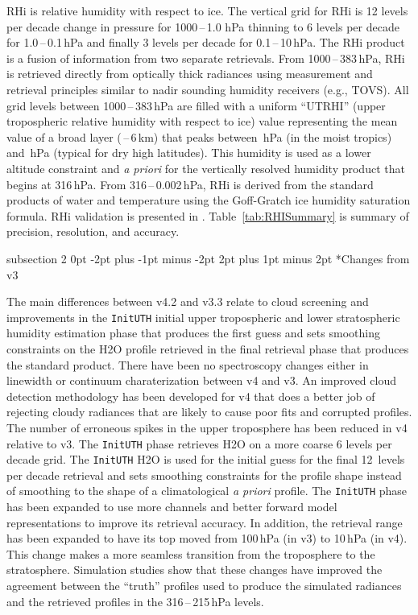 \documentclass[11pt,draft]{report}
\makeatletter
\renewcommand{\subsection}{\@startsection%
  {subsection}%
  {2}%
  {0pt}%
  {-2pt plus -1pt minus -2pt}%
  {2pt plus 1pt minus 2pt}%
  {\large\sffamily\fontseries{sb}\selectfont\flushleft\color{SectionColor}\figureversion{tabular}}}%
\makeatother
\begin{document}
RHi is relative humidity with respect to ice. The vertical grid for RHi
is 12 levels per decade change in pressure for 1000\,--\,1.0 hPa
thinning to 6 levels per decade for 1.0\,--\,0.1\,hPa and finally 3
levels per decade for 0.1\,--\,10\,hPa.  The RHi product is a
fusion of information from two separate retrievals.  From
1000\,--\,383\,hPa, RHi is retrieved directly from optically thick
radiances using measurement and retrieval principles similar to nadir
sounding humidity receivers (e.g., TOVS).  All grid levels between
1000\,--\,383\,hPa are filled with a uniform ``UTRHI'' (upper
tropospheric relative humidity with respect to ice) value representing
the mean value of a broad layer (\,--\,6\,km) that peaks
between \,hPa (in the moist tropics) and
\,hPa (typical for dry high latitudes).  This humidity
is used as a lower altitude constraint and \emph{a priori} for the
vertically resolved humidity product that begins at 316\,hPa. From
316\,--\,0.002\,hPa, RHi is derived from the standard products of water
and temperature using the Goff-Gratch ice humidity saturation
formula. RHi validation is presented in
\citet{ReadEtal07}. Table~\ref{tab:RHISummary} is summary of precision,
resolution, and accuracy.

\subsection*{Changes from v3}

The main differences between v4.2 and v3.3 relate to cloud screening and
improvements in the \texttt{InitUTH} initial upper tropospheric and
lower stratospheric humidity estimation phase that produces the first
guess and sets smoothing constraints on the H\cs2O profile retrieved in
the final retrieval phase that produces the standard product. There have
been no spectroscopy changes either in linewidth or continuum
charaterization between v4 and v3. An improved cloud detection
methodology has been developed for v4 that does a better job of
rejecting cloudy radiances that are likely to cause poor fits and
corrupted profiles. The number of erroneous spikes in the upper
troposphere has been reduced in v4 relative to v3. The \texttt{InitUTH}
phase retrieves H\cs2O on a more coarse 6 levels per decade grid. The
\texttt{InitUTH} H\cs2O is used for the initial guess for the final
12~levels per decade retrieval and sets smoothing constraints for the
profile shape instead of smoothing to the shape of a climatological
\emph{a priori} profile.  The \texttt{InitUTH} phase has been expanded to use
more channels and better forward model representations to improve its
retrieval accuracy. In addition, the retrieval range has been expanded
to have its top moved from 100\,hPa (in v3) to 10\,hPa (in v4). This
change makes a more seamless transition from the troposphere to the
stratosphere. Simulation studies show that these changes have improved
the agreement between the ``truth'' profiles used to produce the
simulated radiances and the retrieved profiles in the 316\,--\,215\,hPa
levels.
\end{document}
